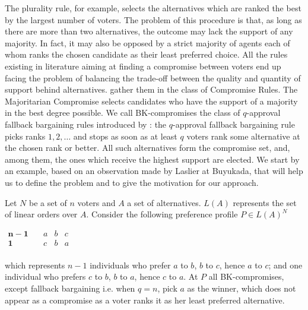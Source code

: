 \documentclass[version=3.21, pagesize, notitlepage, twoside=off, bibliography=totoc, DIV=calc, fontsize=12pt, a4paper]{scrartcl}
\begin{document}
The plurality rule, for example, selects the alternatives which are ranked the best by the largest number of voters. The problem of this procedure is that, as long as there are more than two alternatives, the outcome may lack the support of any majority. In fact, it may also be opposed by a strict majority of agents each of whom ranks the chosen candidate as their least preferred choice. All the rules existing in literature aiming at finding a compromise between voters end up facing the problem of balancing the trade-off between the quality and quantity of support behind alternatives. \citet{Merlin2019} gather them in the class of Compromise Rules. The Majoritarian Compromise \citep{Sertel1999} selects candidates who have the support of a majority in the best degree possible. 
We call BK-compromises the class of $q$-approval fallback bargaining rules introduced by \citet{Brams2001}: the $q$-approval fallback bargaining rule picks ranks $1, 2, \dots$ and stops as soon as at least $q$ voters rank some alternative at the chosen rank or better. All such alternatives form the compromise set, and, among them, the ones which receive the highest support are elected.
We start by an example, based on an observation made by Laslier at Buyukada, that will help us to define the problem and to give the motivation for our approach.


\begin{example}
	\label{ex:ex1}
	Let $N$ be a set of $n$ voters and $A$ a set of alternatives. $L(A)$ represents the set of linear orders over $A$. Consider the following preference profile $P\in L(A)^{N}$
	\begin{center}
		$
		\begin{array}{cccc}
		\mathbf{n-1} \quad &a&b&c\\
		\mathbf{1} \quad &c&b&a\\
		\end{array}
		$
	\end{center}
	which represents $n-1$ individuals who prefer $a$ to $b$, $b$ to $c$, hence $a$ to $c$; and one individual who prefers $c$ to $b$, $b$ to $a$, hence $c$ to $a $. At $P$ all BK-compromises, except fallback bargaining i.e. when $q=n$, pick $a$ as the winner, which does not appear as a compromise as a voter ranks it as her least preferred alternative.
\end{example}
\end{document}
